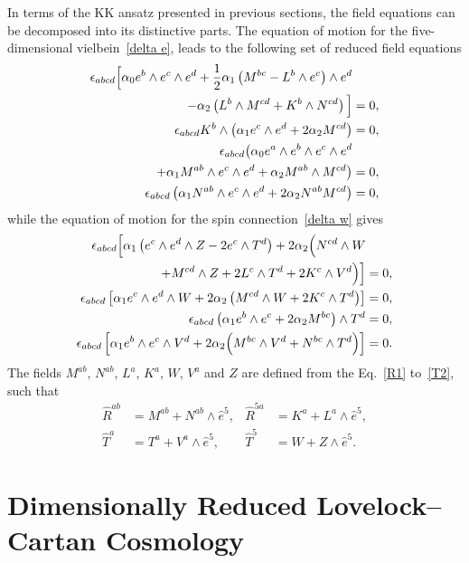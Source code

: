\documentclass[aps,prd,12pt,superscriptaddress,showpacs,showkeys,longbibliography,reprint,nofootinbib]{revtex4-1}
\begin{document}
In terms of the KK ansatz presented in previous sections, the field equations can be decomposed into its distinctive parts. The equation of motion for the five-dimensional vielbein~\eqref{delta e}, leads to the following set of reduced field equations
\begin{align}\label{equation}
  \epsilon_{abcd}\Big[\alpha_0 e^b\wedge e^c\wedge e^d + \frac{1}{2}\alpha_1\left(M^{bc}-L^b\wedge e^c\right)\wedge e^d&\notag\\
    -\alpha_2\left(L^b\wedge M^{cd} + K^b\wedge N^{cd}\right)\Big]&=0,\\
  \epsilon_{abcd}K^b\wedge\left(\alpha_1e^c\wedge e^d + 2\alpha_2M^{cd}\right)&=0,\\
  \epsilon_{abcd}\big(\alpha_0 e^a\wedge e^b\wedge e^c\wedge e^d&\notag\\
  +\alpha_1M^{ab}\wedge e^c\wedge e^d+\alpha_2M^{ab}\wedge M^{cd}\big)&=0,\\
  \epsilon_{abcd}\left(\alpha_1N^{ab}\wedge e^c\wedge e^d+2\alpha_2N^{ab}M^{cd}\right)&=0,
\end{align}
while the equation of motion for the spin connection~\eqref{delta w} gives
\begin{align}
  \epsilon_{abcd}\Big[\alpha_1\left(e^c\wedge e^d\wedge Z-2e^c\wedge T^d\right)
    +2\alpha_2\Big(N^{cd}\wedge W&\notag\\
    +M^{cd}\wedge Z+2L^c\wedge T^d
    +2K^c\wedge V^d\Big)\Big]&=0,\\
  \epsilon_{abcd}\left[\alpha_1e^c\wedge e^ d\wedge W+2\alpha_2\left(M^{cd}\wedge W+2K^c\wedge T^d\right)\right]&=0,\\
  \epsilon_{abcd}\left(\alpha_1e^b\wedge e^c+2\alpha_2M^{bc}\right)\wedge T^d&=0,\\
  \epsilon_{abcd}\left[\alpha_1e^b\wedge e^c\wedge V^d+2\alpha_2\Big(M^{bc}\wedge V^d+N^{bc}\wedge T^d\Big)\right]&=0.
\end{align}
The fields $M^{ab}$, $N^{ab}$, $L^a$, $K^a$, $W$, $V^a$ and $Z$ are defined from the Eq.~\eqref{R1} to~\eqref{T2}, such that
\begin{align*}
  \hat{R}^{ab}&=M^{ab}+N^{ab}\wedge\hat{e}^5, & \hat{R}^{5a}&=K^a+L^a\wedge\hat{e}^5,\\
  \hat{T}^a&=T^a+V^a\wedge\hat{e}^5, & \hat{T}^5&=W+Z\wedge\hat{e}^5.
\end{align*}


\section{Dimensionally Reduced Lovelock--Cartan Cosmology\label{cosmos}}
\end{document}
